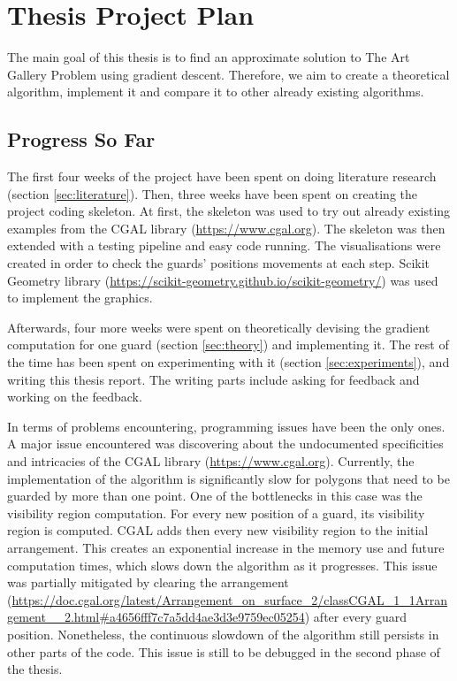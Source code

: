\section{Thesis Project Plan}
\label{sec:thesis}
The main goal of this thesis is to find an approximate solution to The Art Gallery Problem \cite{o1987art} using gradient descent. Therefore, we aim to create a theoretical algorithm, implement it and compare it to other already existing algorithms.

\subsection{Progress So Far}
The first four weeks of the project have been spent on doing literature research (section \ref{sec:literature}). Then, three weeks have been spent on creating the project coding skeleton. At first, the skeleton was used to try out already existing examples from the CGAL library (\url{https://www.cgal.org}). The skeleton was then extended with a testing pipeline and easy code running. The visualisations were created in order to check the guards' positions movements at each step. Scikit Geometry library (\url{https://scikit-geometry.github.io/scikit-geometry/}) was used to implement the graphics.

Afterwards, four more weeks were spent on theoretically devising the gradient computation for one guard (section \ref{sec:theory}) and implementing it. The rest of the time has been spent on experimenting with it (section \ref{sec:experiments}), and writing this thesis report. The writing parts include asking for feedback and working on the feedback.

In terms of problems encountering, programming issues have been the only ones. A major issue encountered was discovering about the undocumented specificities and intricacies of the CGAL library (\url{https://www.cgal.org}). 
Currently, the implementation of the algorithm is significantly slow for polygons that need to be guarded by more than one point. One of the bottlenecks in this case was the visibility region computation. For every new position of a guard, its visibility region is computed. CGAL adds then every new visibility region to the initial arrangement. This creates an exponential increase in the memory use and future computation times, which slows down the algorithm as it progresses. This issue was partially mitigated by clearing the arrangement (\url{https://doc.cgal.org/latest/Arrangement_on_surface_2/classCGAL_1_1Arrangement__2.html#a4656fff7c7a5dd4ae3d3e9759ec05254}) after every guard position.
Nonetheless, the continuous slowdown of the algorithm still persists in other parts of the code. This issue is still to be debugged in the second phase of the thesis. 


